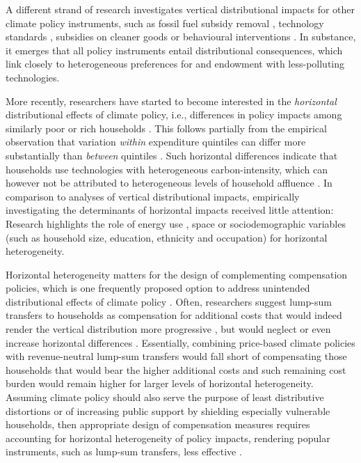 \documentclass[12pt, a4paper]{article}
\begin{document}
A different strand of research investigates vertical distributional impacts for other climate policy instruments, such as fossil fuel subsidy removal \autocite{Schaffitzel.2019,Giuliano.2020,DelArzeGranado.2012}, technology standards \autocite{Levinson.2019,Zhao.2022,Bruegge.2019}, subsidies on cleaner goods \autocite{Borenstein.2016,Vaishnav.2017,Winter.2019} or behavioural interventions \autocite{DellaValle.2020,Liebe.2021}. In substance, it emerges that all policy instruments entail distributional consequences, which link closely to heterogeneous preferences for and endowment with less-polluting technologies. 

More recently, researchers have started to become interested in the \textit{horizontal} distributional effects of climate policy, i.e., differences in policy impacts among similarly poor or rich households \autocite{Rausch.2011,Fischer.2019}. This follows partially from the empirical observation that variation \textit{within} expenditure quintiles can differ more substantially than \textit{between} quintiles \autocite{Cronin.2019,Steckel.2021b,Pizer.2019}. Such horizontal differences indicate that households use technologies with heterogeneous carbon-intensity, which can however not be attributed to heterogeneous levels of household affluence \autocite{Hansel.2022}. In comparison to analyses of vertical distributional impacts, empirically investigating the determinants of horizontal impacts received little attention: Research highlights the role of energy use \autocite{Steckel.2021b,Missbach.2024}, space \autocite{Chan.2023,Burtraw.2009} or sociodemographic variables (such as household size, education, ethnicity and occupation) \autocite{Grainger.2010,Buchs.2013,Farrell.2017,Missbach.2023,Fremstad.2019} for horizontal heterogeneity.

Horizontal heterogeneity matters for the design of complementing compensation policies, which is one frequently proposed option to address unintended distributional effects of climate policy \autocite{Klenert.2018,Baranzini.2017}. Often, researchers suggest lump-sum transfers to households as compensation for additional costs \autocite{Stiglitz.2017,Baranzini.2000,Metcalf.2009} that would indeed render the vertical distribution more progressive \autocite{Budolfson.2021,vanderPloeg.2022}, but would neglect or even increase horizontal differences \autocite{Cronin.2019,Hansel.2022}. Essentially, combining price-based climate policies with revenue-neutral lump-sum transfers would fall short of compensating those households that would bear the higher additional costs and such remaining cost burden would remain higher for larger levels of horizontal heterogeneity. Assuming climate policy should also serve the purpose of least distributive distortions \autocite{Fischer.2019} or of increasing public support by shielding especially vulnerable households, then appropriate design of compensation measures requires accounting for horizontal heterogeneity of policy impacts, rendering popular instruments, such as lump-sum transfers, less effective \autocite{Fullerton.2019,Missbach.2024}. 
\end{document}
